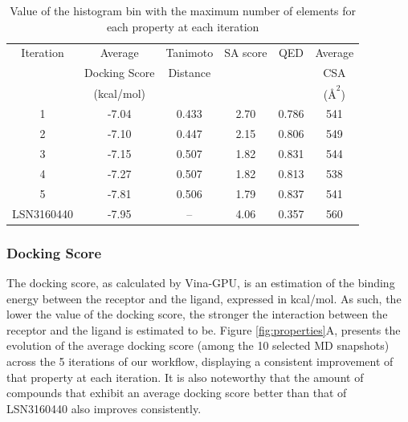 \documentclass[letterpaper]{article}
\begin{document}
\begin{table}[H]
  \caption{Value of the histogram bin with the maximum number of elements for each property at each iteration}
  \label{tab:hist_bin_center}
  \centering
  \begin{tabular}{cccccc}
    \hline
    Iteration            & Average       & Tanimoto & SA score & QED   & Average            \\
                         & Docking Score & Distance &          &       & CSA                \\
                         & (kcal/mol)    &          &          &       & ($\text{\AA}^{2}$) \\
    \hline
    1                    & -7.04         & 0.433    & 2.70     & 0.786 & 541                \\
    2                    & -7.10         & 0.447    & 2.15     & 0.806 & 549                \\
    3                    & -7.15         & 0.507    & 1.82     & 0.831 & 544                \\
    4                    & -7.27         & 0.507    & 1.82     & 0.813 & 538                \\
    5                    & -7.81         & 0.506    & 1.79     & 0.837 & 541                \\
    \hline
    LSN3160440                  & -7.95         & --       & 4.06     & 0.357 & 560                \\
    \hline
  \end{tabular}
\end{table}

\subsubsection{Docking Score}\label{sec:results-docking_score}
The docking score, as calculated by Vina-GPU, is an estimation of the binding energy between the receptor and the ligand, expressed in kcal/mol. As such, the lower the value of the docking score, the stronger the interaction between the receptor and the ligand is estimated to be. Figure \ref{fig:properties}A, presents the evolution of the average docking score (among the 10 selected MD snapshots) across the 5 iterations of our workflow, displaying a consistent improvement of that property at each iteration. It is also noteworthy that the amount of compounds that exhibit an average docking score better than that of LSN3160440 also improves consistently.
\end{document}
